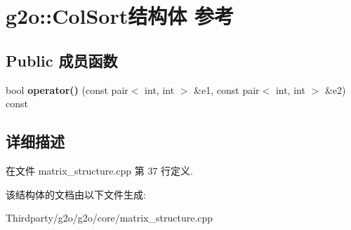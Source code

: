 \hypertarget{structg2o_1_1ColSort}{\section{g2o\-:\-:Col\-Sort结构体 参考}
\label{structg2o_1_1ColSort}
}
\subsection*{Public 成员函数}
\begin{DoxyCompactItemize}
\item 
\hypertarget{structg2o_1_1ColSort_a228d871d0007190ef880d303e56af609}{bool {\bfseries operator()} (const pair$<$ int, int $>$ \&e1, const pair$<$ int, int $>$ \&e2) const }\label{structg2o_1_1ColSort_a228d871d0007190ef880d303e56af609}

\end{DoxyCompactItemize}


\subsection{详细描述}


在文件 matrix\-\_\-structure.\-cpp 第 37 行定义.



该结构体的文档由以下文件生成\-:\begin{DoxyCompactItemize}
\item 
Thirdparty/g2o/g2o/core/matrix\-\_\-structure.\-cpp\end{DoxyCompactItemize}

